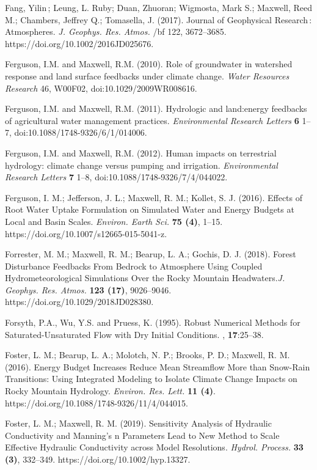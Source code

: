 \begin{thebibliography}{999}
Fang, Yilin ; Leung, L. Ruby; Duan, Zhuoran; Wigmosta, Mark S.; Maxwell, Reed M.; Chambers, Jeffrey Q.; Tomasella, J. (2017). Journal of Geophysical Research : Atmospheres. {\em J. Geophys. Res. Atmos.} {/bf 122}, 3672–3685. https://doi.org/10.1002/2016JD025676.

Ferguson, I.M. and Maxwell, R.M. (2010). Role of groundwater in watershed response and land surface feedbacks under climate change. {\em Water Resources Research} 46, W00F02, doi:10.1029/2009WR008616.

Ferguson, I.M. and Maxwell, R.M. (2011). Hydrologic and land:energy feedbacks of agricultural water management practices. {\em Environmental Research Letters} {\bf 6} 1--7, doi:10.1088/1748-9326/6/1/014006.

Ferguson, I.M. and Maxwell, R.M. (2012). Human impacts on terrestrial hydrology: climate change versus pumping and irrigation. {\em Environmental Research Letters} {\bf 7} 1--8, doi:10.1088/1748-9326/7/4/044022.

Ferguson, I. M.; Jefferson, J. L.; Maxwell, R. M.; Kollet, S. J. (2016). Effects of Root Water Uptake Formulation on Simulated Water and Energy Budgets at Local and Basin Scales. {\em Environ. Earth Sci.} {\bf 75 (4)}, 1–15. https://doi.org/10.1007/s12665-015-5041-z.

Forrester, M. M.; Maxwell, R. M.; Bearup, L. A.; Gochis, D. J. (2018). Forest Disturbance Feedbacks From Bedrock to Atmosphere Using Coupled Hydrometeorological Simulations Over the Rocky Mountain Headwaters.{\em J. Geophys. Res. Atmos.} {\bf 123 (17)}, 9026–9046. https://doi.org/10.1029/2018JD028380.

Forsyth, P.A., Wu, Y.S. and Pruess, K. (1995).
\newblock Robust Numerical Methods for Saturated-Unsaturated Flow with Dry Initial Conditions.
, {\bf 17}:25--38.

Foster, L. M.; Bearup, L. A.; Molotch, N. P.; Brooks, P. D.; Maxwell, R. M. (2016). Energy Budget Increases Reduce Mean Streamflow More than Snow-Rain Transitions: Using Integrated Modeling to Isolate Climate Change Impacts on Rocky Mountain Hydrology. {\em Environ. Res. Lett.} {\bf 11 (4)}. https://doi.org/10.1088/1748-9326/11/4/044015.


Foster, L. M.; Maxwell, R. M. (2019). Sensitivity Analysis of Hydraulic Conductivity and Manning’s n Parameters Lead to New Method to Scale Effective Hydraulic Conductivity across Model Resolutions. {\em Hydrol. Process.} {\bf 33 (3)}, 332–349. https://doi.org/10.1002/hyp.13327.



\end{thebibliography}
